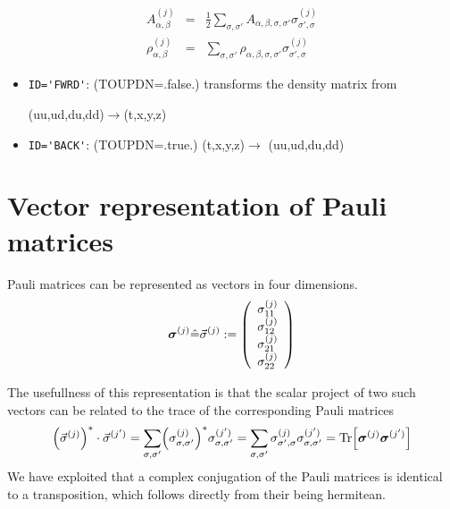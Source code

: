 \documentclass[11pt,a4paper]{report}
\begin{document}
\begin{eqnarray}
A^{(j)}_{\alpha,\beta}&=&
\frac{1}{2}
\sum_{\sigma,\sigma'}
A_{\alpha,\beta,\sigma,\sigma'}\sigma^{(j)}_{\sigma',\sigma}
\nonumber\\
\rho^{(j)}_{\alpha,\beta}&=&
\sum_{\sigma,\sigma'}
\rho_{\alpha,\beta,\sigma,\sigma'}\sigma^{(j)}_{\sigma',\sigma}
\end{eqnarray}


\begin{itemize}
\item \verb|ID='FWRD'|: (TOUPDN=.false.) transforms the density matrix from 

(uu,ud,du,dd)$\rightarrow$(t,x,y,z)
\item \verb|ID='BACK'|: (TOUPDN=.true.) (t,x,y,z)$\rightarrow$ (uu,ud,du,dd)
\end{itemize}


\appendix
\chapter{Vector representation of Pauli matrices}
Pauli matrices can be represented as vectors in four dimensions.  
\begin{eqnarray}
\bm{\sigma}^{(j)}\hat{=}\vec{\sigma}^{(j)}:=
\left(\begin{array}{c}\sigma^{(j)}_{11}\\\sigma^{(j)}_{12}\\\sigma^{(j)}_{21}\\\sigma^{(j)}_{22}\end{array}\right)
\label{eq:vectorrepresentationpaulimatrices}
\end{eqnarray}

The usefullness of this representation is that the scalar project of
two such vectors can be related to the trace of the corresponding
Pauli matrices
\begin{eqnarray}
\Bigl(\vec{\sigma}^{(j)}\Bigr)^*\cdot\vec{\sigma}^{(j')}
=\sum_{\sigma,\sigma'}\Bigl(\sigma^{(j)}_{\sigma,\sigma'}\Bigr)^*
\sigma^{(j')}_{\sigma,\sigma'}
=\sum_{\sigma,\sigma'}\sigma^{(j)}_{\sigma',\sigma}
\sigma^{(j')}_{\sigma,\sigma'}
=\mathrm{Tr}\Bigl[\bm{\sigma}^{(j)}
\bm{\sigma}^{(j')}\Bigr]
\label{eq:vectorrepresentationpaulimatricesscalarproduct}
\end{eqnarray}
We have exploited that a complex conjugation of the Pauli matrices is
identical to a transposition, which follows directly from their
being hermitean.
\end{document}
